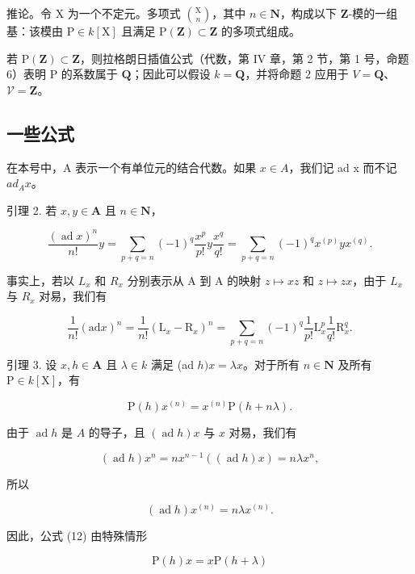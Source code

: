 推论。令 \(\mathrm{X}\) 为一个不定元。多项式 \(\binom{\mathrm{X}}{n}\)，其中 \(n \in \mathbf{N}\)，构成以下 \(\mathbf{Z}\)-模的一组基：该模由 \(\mathrm{P} \in k[\mathrm{X}]\) 且满足 \(\mathrm{P}(\mathbf{Z}) \subset \mathbf{Z}\) 的多项式组成。

若 \(\mathrm{P}(\mathbf{Z}) \subset \mathbf{Z}\)，则拉格朗日插值公式（代数，第 IV 章，第 2 节，第 1 号，命题 6）表明 P 的系数属于 \(\mathbf{Q}\)；因此可以假设 \(k = \mathbf{Q}\)，并将命题 2 应用于 \(V = \mathbf{Q}\)、\(\mathcal{V} = \mathbf{Z}\)。

\subsection{一些公式}

在本号中，A 表示一个有单位元的结合代数。如果 \(x \in A\)，我们记 ad x 而不记 \(ad_{A}x\)。

引理 2. 若 \(x, y \in \mathbf{A}\) 且 \(n \in \mathbf{N}\)，

\[
\frac {(\operatorname{ad} x) ^ {n}}{n !} y = \sum_ {p + q = n} (- 1) ^ {q} \frac {x ^ {p}}{p !} y \frac {x ^ {q}}{q !} = \sum_ {p + q = n} (- 1) ^ {q} x ^ {(p)} y x ^ {(q)}.\tag{11}
\]

事实上，若以 \(L_{x}\) 和 \(R_{x}\) 分别表示从 A 到 A 的映射 \(z \mapsto xz\) 和 \(z \mapsto zx\)，由于 \(L_{x}\) 与 \(R_{x}\) 对易，我们有

\[
\frac {1}{n !} (\mathrm{ad} x) ^ {n} = \frac {1}{n !} (\mathrm{L} _ {x} - \mathrm{R} _ {x}) ^ {n} = \sum_ {p + q = n} (- 1) ^ {q} \frac {1}{p !} \mathrm{L} _ {x} ^ {p} \frac {1}{q !} \mathrm{R} _ {x} ^ {q}.
\]

引理 3. 设 \(x, h \in \mathbf{A}\) 且 \(\lambda \in k\) 满足 (ad \(h)x = \lambda x\)。对于所有 \(n \in \mathbf{N}\) 及所有 \(\mathrm{P} \in k[\mathrm{X}]\)，有

\[
\mathrm{P} (h) x ^ {(n)} = x ^ {(n)} \mathrm{P} (h + n \lambda).\tag{12}
\]

由于 \(\operatorname{ad} h\) 是 \(A\) 的导子，且 \((\operatorname{ad} h)x\) 与 \(x\) 对易，我们有

\[
(\operatorname{ad} h) x ^ {n} = n x ^ {n - 1} ((\operatorname{ad} h) x) = n \lambda x ^ {n},\tag{13}
\]

所以

\[
(\operatorname{ad} h) x ^ {(n)} = n \lambda x ^ {(n)}.
\]

因此，公式 (12) 由特殊情形

\[
\mathrm{P} (h) x = x \mathrm{P} (h + \lambda)\tag{14}
\]

